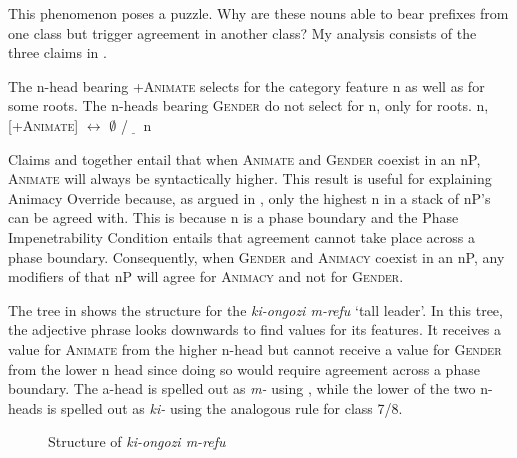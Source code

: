 \documentclass[output=paper
,newtxmath
,modfonts
,nonflat]{langsci/langscibook}
\begin{document}
 
 

 
This phenomenon poses a puzzle. Why are these nouns able to bear prefixes from one class but trigger agreement in another class?  My analysis consists of the three claims in .

\ea\label{ex:pesetsky:threeclaims} \ea\label{ex:pesetsky:claimone} The n-head bearing +\textsc{Animate} selects for the category feature n as well as for some roots. 
\ex\label{ex:pesetsky:claimtwo} The n-heads bearing \textsc{Gender} do not select for n, only for roots. 
\ex\label{ex:pesetsky:claimthree} n, [+\textsc{Animate}] $\longleftrightarrow$ $\emptyset$ /$\underline{ \, \, \; \, }$ n \z \z 

Claims  and  together entail that when \textsc{Animate} and \textsc{Gender} coexist in an nP, \textsc{Animate} will always be syntactically higher. This result is useful for explaining Animacy Override because, as argued in \citet{kramer15}, only the highest n in a stack of nP's can be agreed with. This is because n is a phase boundary and the Phase Impenetrability Condition entails that agreement cannot take place across a phase boundary. Consequently, when \textsc{Gender} and \textsc{Animacy} coexist in an nP, any modifiers of that nP will agree for \textsc{Animacy} and not for \textsc{Gender}.  

The tree in  shows the structure for the  \textit{ki-ongozi m-refu} `tall leader'. In this tree, the adjective phrase looks downwards to find values for its  features.  It receives a value for \textsc{Animate} from the higher n-head but cannot receive a value for \textsc{Gender} from the lower n head since doing so would require agreement across a phase boundary. The a-head is spelled out as \textit{m-} using , while the lower of the two n-heads is spelled out as \textit{ki-} using the analogous rule for class 7/8.

\begin{figure}[htbp]
\begin{center}

\caption{Structure of \textit{ki-ongozi m-refu}}
\label{ex:pesetsky:towerofanimacy}

\end{center}
\end{figure}
\end{document}
